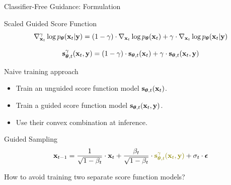 \documentclass{beamer}
\renewcommand{\eqpause}{}
\begin{document}
\begin{frame}{Classifier-Free Guidance: Formulation}
	\begin{block}{Scaled Guided Score Function}
		\vspace{-0.5cm}
		\[
			\nabla_{\mathbf{x}_t}^{\gamma} \log p_{\boldsymbol{\theta}}(\mathbf{x}_t | \mathbf{y}) =  (1 - \gamma) \cdot  \nabla_{\mathbf{x}_t} \log p_{\boldsymbol{\theta}}(\mathbf{x}_t) + \gamma \cdot  \nabla_{\mathbf{x}_t} \log p_{\boldsymbol{\theta}}(\mathbf{x}_t| \mathbf{y})
		\]
		\vspace{-0.5cm}
		\eqpause
		\[
			\mathbf{s}^{\gamma}_{\boldsymbol{\theta}, t}(\mathbf{x}_t, \mathbf{y}) = (1 - \gamma) \cdot \mathbf{s}_{\boldsymbol{\theta}, t}(\mathbf{x}_t) +  \gamma \cdot \mathbf{s}_{\boldsymbol{\theta}, t}(\mathbf{x}_t, \mathbf{y})
		\]
		\vspace{-0.5cm}
	\end{block}
	\eqpause
	\begin{block}{Naive training approach}
		\begin{itemize}
			\item Train an unguided score function model $\mathbf{s}_{\boldsymbol{\theta}, t}(\mathbf{x}_t)$.
			\item Train a guided score function model $\mathbf{s}_{\boldsymbol{\theta}, t}(\mathbf{x}_t, \mathbf{y})$.
			\eqpause
			\item Use their convex combination at inference.
		\end{itemize}
	\end{block}
	\begin{block}{Guided Sampling}
		\vspace{-0.3cm}
		\[
			\bx_{t-1} = \frac{1}{\sqrt{1 - \beta_t}} \cdot \bx_t + \frac{\beta_t}{\sqrt{1 - \beta_t}} \cdot  {\color{olive}\bs^{\gamma}_{\btheta, t}(\bx_t, \by)} + \sigma_t \cdot \bepsilon
		\]
		\vspace{-0.3cm}
	\end{block}
	\eqpause
	How to avoid training two separate score function models?
\end{frame}
\end{document}
